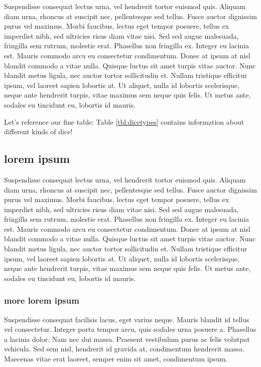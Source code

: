 \documentclass{jamk-report}
\begin{document}
Suspendisse consequat lectus urna, vel hendrerit tortor euismod quis. Aliquam
diam urna, rhoncus at suscipit nec, pellentesque sed tellus. Fusce auctor
dignissim purus vel maximus. Morbi faucibus, lectus eget tempor posuere, tellus
ex imperdiet nibh, sed ultricies risus diam vitae nisi. Sed sed augue
malesuada, fringilla sem rutrum, molestie erat.  Phasellus non fringilla ex.
Integer eu lacinia est. Mauris commodo arcu eu consectetur condimentum. Donec
at ipsum at nisl blandit commodo a vitae nulla.  Quisque luctus sit amet turpis
vitae auctor. Nunc blandit metus ligula, nec auctor tortor sollicitudin et.
Nullam tristique efficitur ipsum, vel laoreet sapien lobortis at. Ut aliquet,
nulla id lobortis scelerisque, neque ante hendrerit turpis, vitae maximus sem
neque quis felis. Ut metus ante, sodales eu tincidunt eu, lobortis id mauris.

Let's reference our fine table: Table \ref{tbl:dicetypes} contains information
about different kinds of dice!


\subsection{lorem ipsum}

Suspendisse consequat lectus urna, vel hendrerit tortor euismod quis. Aliquam
diam urna, rhoncus at suscipit nec, pellentesque sed tellus. Fusce auctor
dignissim purus vel maximus. Morbi faucibus, lectus eget tempor posuere, tellus
ex imperdiet nibh, sed ultricies risus diam vitae nisi. Sed sed augue
malesuada, fringilla sem rutrum, molestie erat.  Phasellus non fringilla ex.
Integer eu lacinia est. Mauris commodo arcu eu consectetur condimentum. Donec
at ipsum at nisl blandit commodo a vitae nulla.  Quisque luctus sit amet turpis
vitae auctor. Nunc blandit metus ligula, nec auctor tortor sollicitudin et.
Nullam tristique efficitur ipsum, vel laoreet sapien lobortis at. Ut aliquet,
nulla id lobortis scelerisque, neque ante hendrerit turpis, vitae maximus sem
neque quis felis. Ut metus ante, sodales eu tincidunt eu, lobortis id mauris.

\subsubsection{more lorem ipsum}

Suspendisse consequat facilisis lacus, eget varius neque. Mauris blandit id
tellus vel consectetur. Integer porta tempor arcu, quis sodales urna posuere a.
Phasellus a lacinia dolor. Nam nec dui massa. Praesent vestibulum purus ac
felis volutpat vehicula. Sed sem nisl, hendrerit id gravida at, condimentum
hendrerit massa.  Maecenas vitae erat laoreet, semper enim sit amet,
condimentum ipsum.
\end{document}

